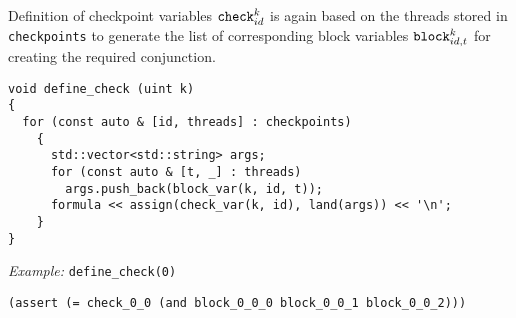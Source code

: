 \noindent
Definition of checkpoint variables $\texttt{check}^k_{id}$ is again based on the threads stored in \texttt{checkpoints} to generate the list of corresponding block variables $\texttt{block}^k_{id, t}$ for creating the required conjunction.

\begin{lstlisting}[style=c++]
void define_check (uint k)
{
  for (const auto & [id, threads] : checkpoints)
    {
      std::vector<std::string> args;
      for (const auto & [t, _] : threads)
        args.push_back(block_var(k, id, t));
      formula << assign(check_var(k, id), land(args)) << '\n';
    }
}
\end{lstlisting}


\noindent
\emph{Example:} \lstinline[style=c++]{define_check(0)}

\begin{lstlisting}[language=SMTLib]
(assert (= check_0_0 (and block_0_0_0 block_0_0_1 block_0_0_2)))
\end{lstlisting}


%
%

